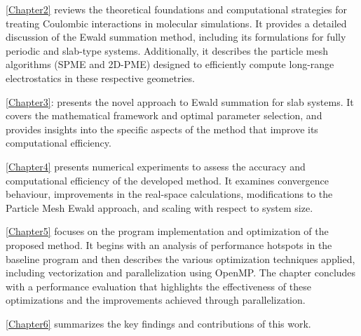 \autoref{Chapter2} reviews the theoretical foundations and computational strategies for treating Coulombic interactions in molecular simulations. It provides a detailed discussion of the Ewald summation method, including its formulations for fully periodic and slab-type systems. Additionally, it describes the particle mesh algorithms (\acs{SPME} and \acs{2D-PME}) designed to efficiently compute long-range electrostatics in these respective geometries.

\autoref{Chapter3}: presents the novel approach to Ewald summation for slab systems. It covers the mathematical framework and optimal parameter selection, and provides insights into the specific aspects of the method that improve its computational efficiency. 

\autoref{Chapter4} presents numerical experiments to assess the accuracy and computational efficiency of the developed method. It examines convergence behaviour, improvements in the real-space calculations, modifications to the Particle Mesh Ewald approach, and scaling with respect to system size.

\autoref{Chapter5} focuses on the program implementation and optimization of the proposed method. It begins with an analysis of performance hotspots in the baseline program and then describes the various optimization techniques applied, including vectorization and parallelization using OpenMP. The chapter concludes with a performance evaluation that highlights the effectiveness of these optimizations and the improvements achieved through parallelization.

\autoref{Chapter6} summarizes the key findings and contributions of this work.